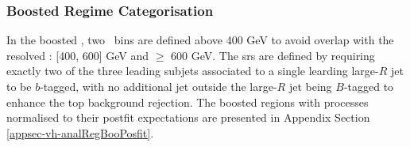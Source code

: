 \subsubsection{Boosted Regime Categorisation}
In the boosted \vhb, two \ptv\ bins are defined above 400 GeV to avoid overlap with the resolved \vhb: [400, 600] GeV and $\geq$ 600 GeV. The \gls{sr}s are defined by requiring exactly two of the three leading subjets associated to a single learding large-$R$ jet to be $b$-tagged, with no additional jet outside the large-$R$ jet being $B$-tagged to enhance the top background rejection. The boosted regions with processes normalised to their postfit expectations are presented in Appendix Section \ref{appsec-vh-analRegBooPosfit}.


